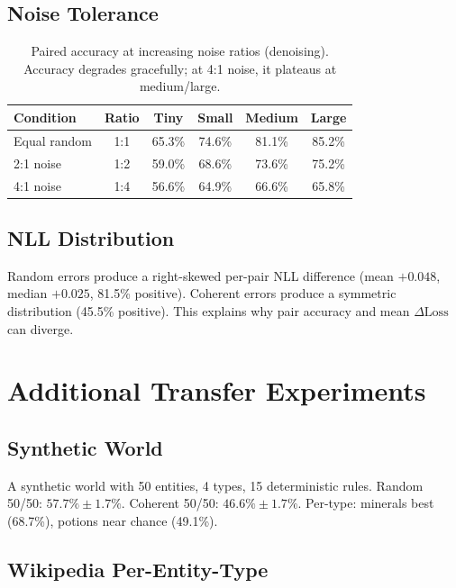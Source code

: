 \documentclass{article}
\begin{document}
\subsection{Noise Tolerance}

\begin{table}[h]
\centering
\small
\begin{tabular}{lccccc}
\toprule
Condition & Ratio & Tiny & Small & Medium & Large \\
\midrule
Equal random & 1:1 & 65.3\% & 74.6\% & 81.1\% & 85.2\% \\
2:1 noise    & 1:2 & 59.0\% & 68.6\% & 73.6\% & 75.2\% \\
4:1 noise    & 1:4 & 56.6\% & 64.9\% & 66.6\% & 65.8\% \\
\bottomrule
\end{tabular}
\caption{Paired accuracy at increasing noise ratios (denoising). Accuracy degrades gracefully; at 4:1 noise, it plateaus at medium/large.}
\label{tab:noise}
\end{table}

\subsection{NLL Distribution}

Random errors produce a right-skewed per-pair NLL difference (mean $+0.048$, median $+0.025$, 81.5\% positive). Coherent errors produce a symmetric distribution (45.5\% positive). This explains why pair accuracy and mean $\Delta\text{Loss}$ can diverge.

\section{Additional Transfer Experiments}
\label{app:transfer}

\subsection{Synthetic World}

A synthetic world with 50 entities, 4 types, 15 deterministic rules. Random 50/50: $57.7\% \pm 1.7\%$. Coherent 50/50: $46.6\% \pm 1.7\%$. Per-type: minerals best (68.7\%), potions near chance (49.1\%).

\subsection{Wikipedia Per-Entity-Type}
\end{document}
